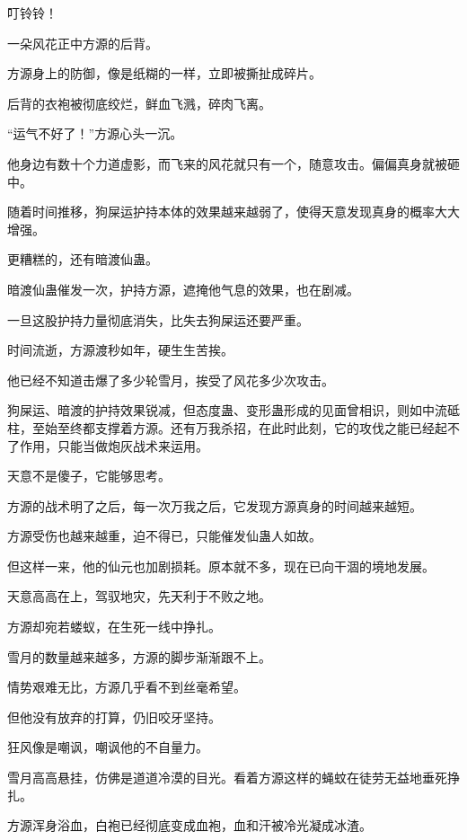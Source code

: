 
\begin{this_body}



叮铃铃！

一朵风花正中方源的后背。

方源身上的防御，像是纸糊的一样，立即被撕扯成碎片。

后背的衣袍被彻底绞烂，鲜血飞溅，碎肉飞离。

“运气不好了！”方源心头一沉。

他身边有数十个力道虚影，而飞来的风花就只有一个，随意攻击。偏偏真身就被砸中。

随着时间推移，狗屎运护持本体的效果越来越弱了，使得天意发现真身的概率大大增强。

更糟糕的，还有暗渡仙蛊。

暗渡仙蛊催发一次，护持方源，遮掩他气息的效果，也在剧减。

一旦这股护持力量彻底消失，比失去狗屎运还要严重。

时间流逝，方源渡秒如年，硬生生苦挨。

他已经不知道击爆了多少轮雪月，挨受了风花多少次攻击。

狗屎运、暗渡的护持效果锐减，但态度蛊、变形蛊形成的见面曾相识，则如中流砥柱，至始至终都支撑着方源。还有万我杀招，在此时此刻，它的攻伐之能已经起不了作用，只能当做炮灰战术来运用。

天意不是傻子，它能够思考。

方源的战术明了之后，每一次万我之后，它发现方源真身的时间越来越短。

方源受伤也越来越重，迫不得已，只能催发仙蛊人如故。

但这样一来，他的仙元也加剧损耗。原本就不多，现在已向干涸的境地发展。

天意高高在上，驾驭地灾，先天利于不败之地。

方源却宛若蝼蚁，在生死一线中挣扎。

雪月的数量越来越多，方源的脚步渐渐跟不上。

情势艰难无比，方源几乎看不到丝毫希望。

但他没有放弃的打算，仍旧咬牙坚持。

狂风像是嘲讽，嘲讽他的不自量力。

雪月高高悬挂，仿佛是道道冷漠的目光。看着方源这样的蝇蚊在徒劳无益地垂死挣扎。

方源浑身浴血，白袍已经彻底变成血袍，血和汗被冷光凝成冰渣。


\end{this_body}
